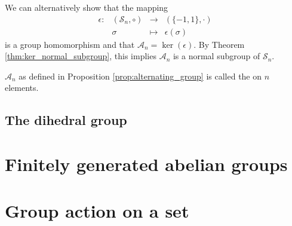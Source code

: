 We can alternatively show that the mapping
\begin{equation*}
    \begin{array}{rccc}
        \epsilon: & (\mathcal{S}_n,\circ) & \to & (\{-1,1\},\cdot) \\
        & \sigma & \mapsto & \epsilon(\sigma)
    \end{array}
\end{equation*}
is a group homomorphism and that $ \mathcal{A}_n=\ker(\epsilon) $. By Theorem \ref{thm:ker_normal_subgroup}, this implies $ \mathcal{A}_n $ is a normal subgroup of $ \mathcal{S}_n $.

\begin{defn}
$ \mathcal{A}_n $ as defined in Proposition \ref{prop:alternating_group} is called the  on $ n $ elements.
\end{defn}

\subsection*{The dihedral group}

\section{Finitely generated abelian groups}

\section{Group action on a set}